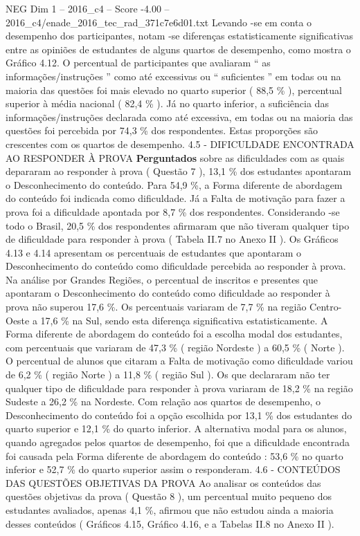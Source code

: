 \begin{textsample}{NEG Dim 1 – 2016\_c4 – Score -4.00 – 2016\_c4/enade\_2016\_tec\_rad\_371c7e6d01.txt}
Levando -se em conta o desempenho dos participantes, notam -se diferenças estatisticamente significativas entre as opiniões de estudantes de alguns quartos de desempenho, como mostra o Gráfico 4.12.
O percentual de participantes que avaliaram “ as informações/instruções ” como até excessivas ou “ suficientes ” em todas ou na maioria das questões foi mais elevado no quarto superior ( 88,5 \% ), percentual superior à média nacional ( 82,4 \% ).
Já no quarto inferior, a suficiência das informações/instruções declarada como até excessiva, em todas ou na maioria das questões foi percebida por 74,3 \% dos respondentes.
Estas proporções são crescentes com os quartos de desempenho. 4.5 - DIFICULDADE ENCONTRADA AO RESPONDER À PROVA \textbf{Perguntados} sobre as dificuldades com as quais depararam ao responder à prova ( Questão 7 ), 13,1 \% dos estudantes apontaram o Desconhecimento do conteúdo.
Para 54,9 \%, a Forma diferente de abordagem do conteúdo foi indicada como dificuldade.
Já a Falta de motivação para fazer a prova foi a dificuldade apontada por 8,7 \% dos respondentes.
Considerando -se todo o Brasil, 20,5 \% dos respondentes afirmaram que não tiveram qualquer tipo de dificuldade para responder à prova ( Tabela II.7 no Anexo II ).
Os Gráficos 4.13 e 4.14 apresentam os percentuais de estudantes que apontaram o Desconhecimento do conteúdo como dificuldade percebida ao responder à prova.
Na análise por Grandes Regiões, o percentual de inscritos e presentes que apontaram o Desconhecimento do conteúdo como dificuldade ao responder à prova não superou 17,6 \%.
Os percentuais variaram de 7,7 \% na região Centro-Oeste a 17,6 \% na Sul, sendo esta diferença significativa estatisticamente.
A Forma diferente de abordagem do conteúdo foi a escolha modal dos estudantes, com percentuais que variaram de 47,3 \% ( região Nordeste ) a 60,5 \% ( Norte ).
O percentual de alunos que citaram a Falta de motivação como dificuldade variou de 6,2 \% ( região Norte ) a 11,8 \% ( região Sul ).
Os que declararam não ter qualquer tipo de dificuldade para responder à prova variaram de 18,2 \% na região Sudeste a 26,2 \% na Nordeste.
Com relação aos quartos de desempenho, o Desconhecimento do conteúdo foi a opção escolhida por 13,1 \% dos estudantes do quarto superior e 12,1 \% do quarto inferior.
A alternativa modal para os alunos, quando agregados pelos quartos de desempenho, foi que a dificuldade encontrada foi causada pela Forma diferente de abordagem do conteúdo : 53,6 \% no quarto inferior e 52,7 \% do quarto superior assim o responderam. 4.6 - CONTEÚDOS DAS QUESTÕES OBJETIVAS DA PROVA Ao analisar os conteúdos das questões objetivas da prova ( Questão 8 ), um percentual muito pequeno dos estudantes avaliados, apenas 4,1 \%, afirmou que não estudou ainda a maioria desses conteúdos ( Gráficos 4.15, Gráfico 4.16, e a Tabelas II.8 no Anexo II ).

\end{textsample}
